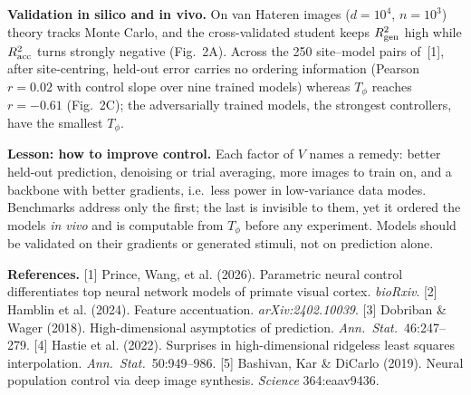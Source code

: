 \documentclass[12pt,letterpaper]{article}
\newif\ifcolorboxes\colorboxestrue
\newcommand{\hlt}[2]{\ifcolorboxes{\setlength{\fboxsep}{1pt}\colorbox{#1}{#2}}\else#2\fi}
\newcommand{\runsection}[1]{\par\vskip0pt plus 3\baselineskip\penalty-100\vskip0pt plus -3\baselineskip\vspace{1.5pt}\noindent\textbf{#1}\hspace{0.5em}\ignorespaces}
\begin{document}
\runsection{Validation in silico and in vivo.}
On van Hateren images ($d=10^4$, $n=10^3$) theory tracks Monte Carlo, and the cross-validated student keeps $R^2_{\rm gen}$ high while $R^2_{\rm acc}$ turns strongly negative (Fig.~2A). Across the 250 site--model pairs of~[1], after site-centring, held-out error carries no ordering information (Pearson $r=0.02$ with control slope over nine trained models) whereas $T_\phi$ reaches $r=-0.61$ (Fig.~2C); the adversarially trained models, the strongest controllers, have the smallest $T_\phi$.

\runsection{Lesson: how to improve control.}
Each factor of $V$ names a remedy: better held-out \hlt{cgen}{prediction}, \hlt{cnoise}{denoising} or trial averaging, \hlt{cdata}{more images} to train on, and a backbone with \hlt{cgeo}{better gradients}, i.e.\ less power in low-variance data modes. Benchmarks address only the first; the last is invisible to them, yet it ordered the models \emph{in vivo} and is computable from $T_\phi$ before any experiment. Models should be validated on their gradients or generated stimuli, not on prediction alone.

\vspace{3pt}
{\fontsize{10}{10.5}\selectfont\setlength{\parskip}{0pt}\noindent\textbf{References.}
[1] Prince, Wang, et al. (2026). Parametric neural control differentiates top neural network models of primate visual cortex. \emph{bioRxiv}.
[2] Hamblin et al. (2024). Feature accentuation. \emph{arXiv:2402.10039}.
[3] Dobriban \& Wager (2018). High-dimensional asymptotics of prediction. \emph{Ann.\ Stat.}\ 46:247--279.
[4] Hastie et al. (2022). Surprises in high-dimensional ridgeless least squares interpolation. \emph{Ann.\ Stat.}\ 50:949--986.
[5] Bashivan, Kar \& DiCarlo (2019). Neural population control via deep image synthesis. \emph{Science} 364:eaav9436.\par}
\end{document}
